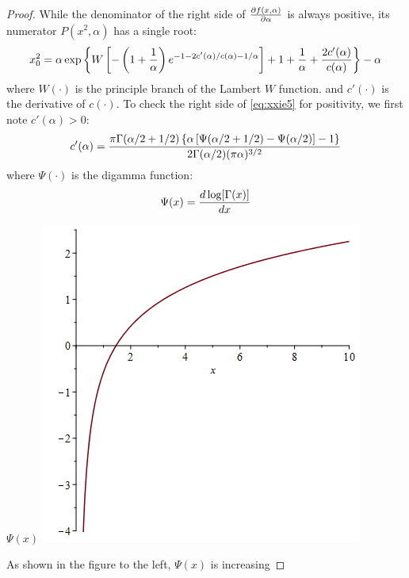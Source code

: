 \begin{subappendices}
\begin{proof}
  While the denominator of the right side of ${\partial f(x, \alpha) \over \partial \alpha}$ is
  always positive, its numerator $P(x^2, \alpha)$ has a single root:
  \begin{equation}
    \label{eq:xxie5}
    x_0^2 = \alpha\exp\left\{
      W\left[
        -\left(1 + {1 \over \alpha}\right)
        e^{-1 - 2 c'(\alpha)/c(\alpha) - 1/\alpha}
      \right]
      + 1 + {1 \over \alpha} + {2 c'(\alpha) \over c(\alpha)}
    \right\} - \alpha
  \end{equation}
  where $W(\cdot)$ is the principle branch of the Lambert $W$
  function. and $c'(\cdot)$ is the derivative of $c(\cdot)$. To check
  the right side of \eqref{eq:xxie5} for positivity, we first note
  $c'(\alpha) > 0$:
  \[
  c'(\alpha) = {
    \pi \Gamma(\alpha/2 + 1/2) \left\{
      \alpha \left[ \Psi(\alpha/2 + 1/2) - \Psi(\alpha/2)\right] - 1
    \right\}
    \over
    2 \Gamma(\alpha/2) (\pi \alpha)^{3/2}
  }
  \]
  where $\Psi(\cdot)$ is the digamma function:
  \[
  \Psi(x) = {d \log[\Gamma(x)] \over d x}
  \]
  \begin{minipage}{0.44\textwidth}
    $\Psi(x)$ \linebreak
    \includegraphics[width=\textwidth]{digamma.png}
  \end{minipage}\hfill
  \begin{minipage}{0.55\textwidth}
    As shown in the figure to the left, $\Psi(x)$ is increasing

\end{minipage}
\end{proof}
\end{subappendices}

